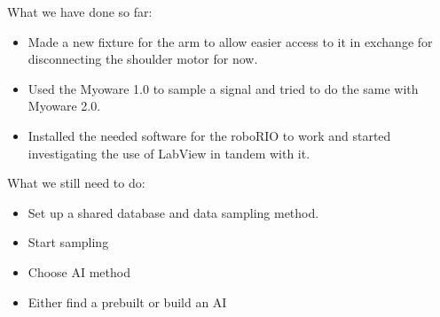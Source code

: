 What we have done so far: 

\begin{itemize}
    
    \item Made a new fixture for the arm to allow easier access to it in exchange for disconnecting the shoulder motor for now.
    
    \item Used the Myoware 1.0 to sample a signal and tried to do the same with Myoware 2.0.
    
    \item Installed the needed software for the roboRIO to work and started investigating the use of LabView in tandem with it.
    
\end{itemize}
What we still need to do:
\begin{itemize}    
    \item Set up a shared database and data sampling method.
    
    \item Start sampling
    
    \item Choose AI method
    
    \item Either find a prebuilt or build an AI
\end{itemize}
